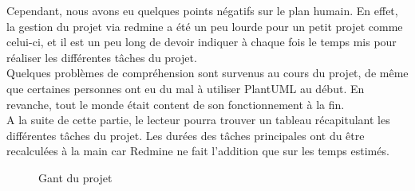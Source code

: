 Cependant, nous avons eu quelques points négatifs sur le plan humain. En effet, la gestion du projet via redmine a été un peu lourde pour un petit projet comme celui-ci, et il est un peu long de devoir indiquer à chaque fois le temps mis pour réaliser les différentes tâches du projet. \\

Quelques problèmes de compréhension sont survenus au cours du projet, de même que certaines personnes ont eu du mal à utiliser PlantUML au début. En revanche, tout le monde était content de son fonctionnement à la fin.\\

A la suite de cette partie, le lecteur pourra trouver un tableau récapitulant les différentes tâches du projet. Les durées des tâches principales ont du être recalculées à la main car Redmine ne fait l'addition que sur les temps estimés. 




\begin{figure}[H]
\noindent{}
\caption{Gant du projet}
\end{figure}



\restoregeometry